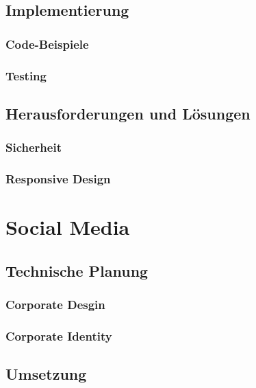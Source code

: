   \subsection{Implementierung}

    \subsubsection{Code-Beispiele}

    \subsubsection{Testing}

  \subsection{Herausforderungen und Lösungen}

    \subsubsection{Sicherheit}

    \subsubsection{Responsive Design}

\section{Social Media}

  \subsection{Technische Planung}

    \subsubsection{Corporate Desgin}

    \subsubsection{Corporate Identity}

  \subsection{Umsetzung}

